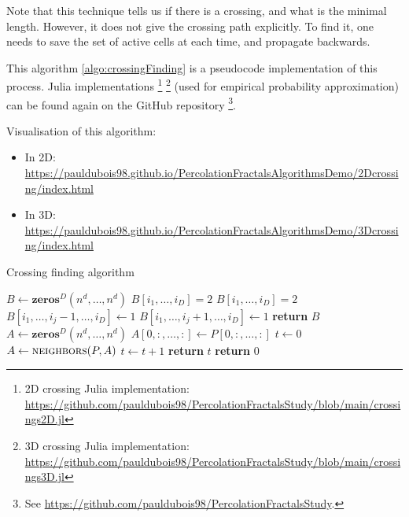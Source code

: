Note that this technique tells us if there is a crossing, and what is the minimal length. However, it does not give the crossing path explicitly.
To find it, one needs to save the set of active cells at each time, and propagate backwards.

This algorithm \ref{algo:crossingFinding} is a pseudocode implementation of this process.
Julia implementations
\footnote{2D crossing Julia implementation: \url{https://github.com/pauldubois98/PercolationFractalsStudy/blob/main/crossings2D.jl}}
\footnote{3D crossing Julia implementation: \url{https://github.com/pauldubois98/PercolationFractalsStudy/blob/main/crossings3D.jl}}
(used for empirical probability approximation) can be found again on the GitHub repository
\footnote{See \url{https://github.com/pauldubois98/PercolationFractalsStudy}.}.

Visualisation of this algorithm:
\begin{itemize}
	\item In 2D: \url{https://pauldubois98.github.io/PercolationFractalsAlgorithmsDemo/2Dcrossing/index.html}
	\item In 3D: \url{https://pauldubois98.github.io/PercolationFractalsAlgorithmsDemo/3Dcrossing/index.html}
\end{itemize}

\begin{algorithm}[!h]
	\caption{Crossing finding algorithm}\label{algo:crossingFinding}
	\begin{algorithmic}[1]
			\State $B \gets \textbf{zeros$^D$}(n^d,\dots,n^d)$ 
					\State $B[i_1,\dots,i_D] = 2$ 
				\EndIf
					\State $B[i_1,\dots,i_D] = 2$ 
							\State $B[i_1,\dots,i_j-1,\dots,i_D] \gets 1$ 
						\EndIf
							\State $B[i_1,\dots,i_j+1,\dots,i_D] \gets 1$ 
						\EndIf
					\EndFor
				\EndIf
			\EndFor
			\State \textbf{return} $B$
		\EndProcedure
			\State $A \gets \textbf{zeros$^D$}(n^d,\dots,n^d)$ 
			\State $A[0,:,\dots,:] \gets P[0,:,\dots,:]$ 
			\State $t \gets 0$
				\State $A \gets \textsc{neighbors}(P,A)$ 
				\State $t \gets t+1$
			\EndWhile
				\State \textbf{return} $t$
			\Else
				\State \textbf{return} $0$
			\EndIf
		\EndProcedure
	\end{algorithmic}
\end{algorithm}

